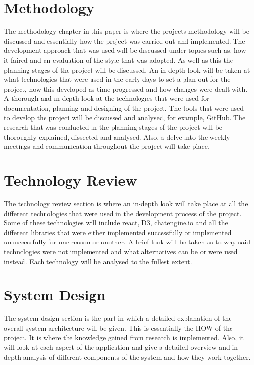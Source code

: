 \section{Methodology}
The methodology chapter in this paper is where the projects methodology will be discussed and essentially how the project was carried out and implemented. The development approach that was used will be discussed under topics such as, how it faired and an evaluation of the style that was adopted. As well as this the planning stages of the project will be discussed. An in-depth look will be taken at what technologies that were used in the early days to set a plan out for the project, how this developed as time progressed and how changes were dealt with. A thorough and in depth look at the technologies that were used for documentation, planning and designing of the project. The tools that were used to develop the project will be discussed and analysed, for example, GitHub. The research that was conducted in the planning stages of the project will be thoroughly explained, dissected and analysed. Also, a delve into the weekly meetings and communication throughout the project will take place. 

\section{Technology Review}
The technology review section is where an in-depth look will take place at all the different technologies that were used in the development process of the project. Some of these technologies will include react, D3, chatengine.io and all the different libraries that were either implemented successfully or implemented unsuccessfully for one reason or another. A brief look will be taken as to why said technologies were not implemented and what alternatives can be or were used instead. Each technology will be analysed to the fullest extent. 

\section{System Design}
The system design section is the part in which a detailed explanation of the overall system architecture will be given. This is essentially the HOW of the project. It is where the knowledge gained from research is implemented. Also, it will look at each aspect of the application and give a detailed overview and in-depth analysis of different components of the system and how they work together. 

